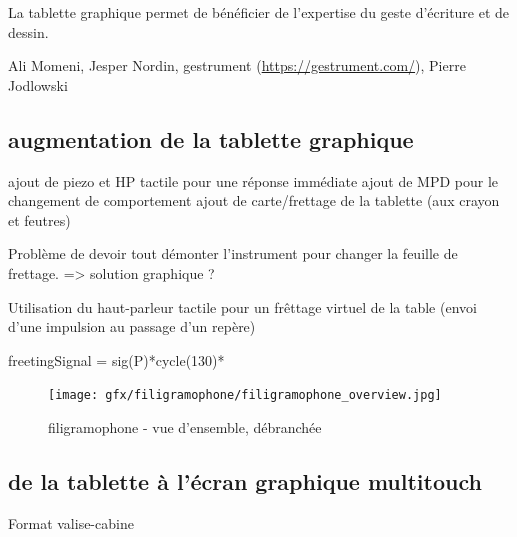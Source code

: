 La tablette graphique permet de bénéficier de l’expertise du geste d’écriture et de dessin.

Ali Momeni, Jesper Nordin, gestrument (\url{https://gestrument.com/}), Pierre Jodlowski


\subsection{augmentation de la tablette graphique}
ajout de piezo et HP tactile pour une réponse immédiate
ajout de MPD pour le changement de comportement
ajout de carte/frettage de la tablette (aux crayon et feutres)

Problème de devoir tout démonter l'instrument pour changer la feuille de frettage. => solution graphique ?

Utilisation du haut-parleur tactile pour un frêttage virtuel de la table (envoi d'une impulsion au passage d'un repère)


freetingSignal = sig(P)*cycle(130)*

\begin{figure}[!htbp]
	\texttt{[image: gfx/filigramophone/filigramophone\_overview.jpg]}
	\caption{filigramophone - vue d'ensemble, débranchée}
	\label{fig:interface:filigramophone}
\end{figure}

\subsection{de la tablette à l'écran graphique multitouch}

Format valise-cabine

